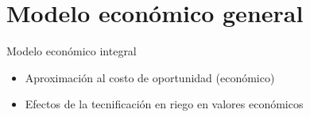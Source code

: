 \documentclass{beamer}\usepackage[]{graphicx}\usepackage[]{color}
\newcommand\blfootnote[1]{%
\begingroup
\renewcommand\thefootnote{}\footnote{#1}%
\addtocounter{footnote}{-1}%
\endgroup
}
\begin{document}





\section{Modelo económico general}
\begin{frame}{Modelo económico integral} \vspace{2pt}
    \begin{itemize}
\pause \item Aproximación al costo de oportunidad (económico)
\pause \item Efectos de la tecnificación en riego en valores económicos
    \end{itemize}
\end{frame}
\end{document}

